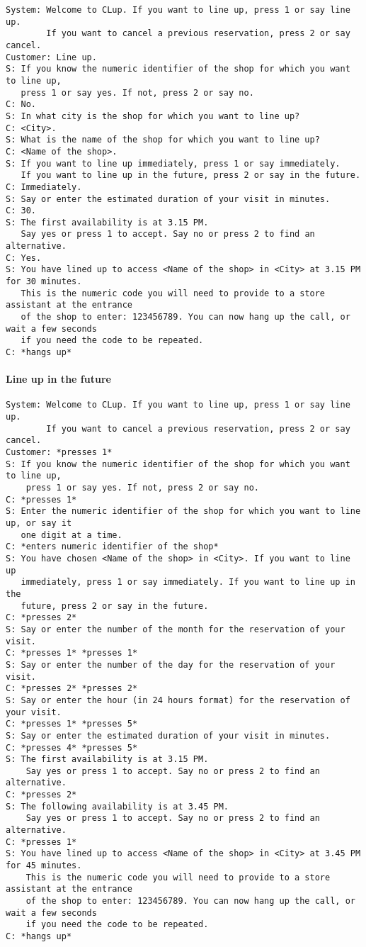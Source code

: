 \documentclass[../../main.tex]{subfiles}
\begin{document}
\begin{verbatim}
System: Welcome to CLup. If you want to line up, press 1 or say line up.
        If you want to cancel a previous reservation, press 2 or say cancel.
Customer: Line up.
S: If you know the numeric identifier of the shop for which you want to line up,
   press 1 or say yes. If not, press 2 or say no.
C: No.
S: In what city is the shop for which you want to line up?
C: <City>.
S: What is the name of the shop for which you want to line up?
C: <Name of the shop>.
S: If you want to line up immediately, press 1 or say immediately.
   If you want to line up in the future, press 2 or say in the future.
C: Immediately.
S: Say or enter the estimated duration of your visit in minutes.
C: 30.
S: The first availability is at 3.15 PM.
   Say yes or press 1 to accept. Say no or press 2 to find an alternative.
C: Yes.
S: You have lined up to access <Name of the shop> in <City> at 3.15 PM for 30 minutes.
   This is the numeric code you will need to provide to a store assistant at the entrance
   of the shop to enter: 123456789. You can now hang up the call, or wait a few seconds
   if you need the code to be repeated.
C: *hangs up*
\end{verbatim}

\paragraph{Line up in the future}

\begin{verbatim}
System: Welcome to CLup. If you want to line up, press 1 or say line up.
        If you want to cancel a previous reservation, press 2 or say cancel.
Customer: *presses 1*
S: If you know the numeric identifier of the shop for which you want to line up,
    press 1 or say yes. If not, press 2 or say no.
C: *presses 1*
S: Enter the numeric identifier of the shop for which you want to line up, or say it
   one digit at a time.
C: *enters numeric identifier of the shop*
S: You have chosen <Name of the shop> in <City>. If you want to line up
   immediately, press 1 or say immediately. If you want to line up in the
   future, press 2 or say in the future.
C: *presses 2*
S: Say or enter the number of the month for the reservation of your visit.
C: *presses 1* *presses 1*
S: Say or enter the number of the day for the reservation of your visit.
C: *presses 2* *presses 2*
S: Say or enter the hour (in 24 hours format) for the reservation of your visit.
C: *presses 1* *presses 5*
S: Say or enter the estimated duration of your visit in minutes.
C: *presses 4* *presses 5*
S: The first availability is at 3.15 PM.
    Say yes or press 1 to accept. Say no or press 2 to find an alternative.
C: *presses 2*
S: The following availability is at 3.45 PM.
    Say yes or press 1 to accept. Say no or press 2 to find an alternative.
C: *presses 1*
S: You have lined up to access <Name of the shop> in <City> at 3.45 PM for 45 minutes.
    This is the numeric code you will need to provide to a store assistant at the entrance
    of the shop to enter: 123456789. You can now hang up the call, or wait a few seconds
    if you need the code to be repeated.
C: *hangs up*
\end{verbatim}
\end{document}
